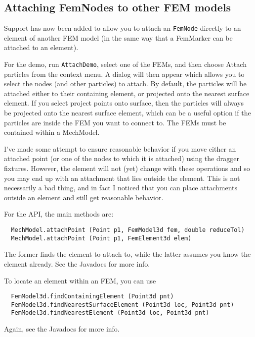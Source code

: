 \documentclass{article}
\begin{document}
\subsection*{Attaching FemNodes to other FEM models}

Support has now been added to allow you to attach an {\tt FemNode}
directly to an element of another FEM model (in the same way that a
FemMarker can be attached to an element).

For the demo, run {\tt AttachDemo}, select one of the FEMs, and then
choose {\sf Attach particles} from the context menu. A dialog will then
appear which allows you to select the nodes (and other particles) to
attach. By default, the particles will be attached either to their
containing element, or projected onto the nearest surface element.  If
you select {\sf project points onto surface}, then the particles will
always be projected onto the nearest surface element, which can be a
useful option if the particles are inside the FEM you want to connect
to. The FEMs must be contained within a MechModel.

I've made some attempt to ensure reasonable behavior if you move
either an attached point (or one of the nodes to which it is attached)
using the dragger fixtures. However, the element will not (yet) change
with these operations and so you may end up with an attachment that
lies outside the element. This is not necessarily a bad thing, and in
fact I noticed that you can place attachments outside an element and
still get reasonable behavior.

For the API, the main methods are:

\begin{lstlisting}
  MechModel.attachPoint (Point p1, FemModel3d fem, double reduceTol)
  MechModel.attachPoint (Point p1, FemElement3d elem)
\end{lstlisting}

The former finds the element to attach to, while the latter assumes you
know the element already. See the Javadocs for more info.

To locate an element within an FEM, you can use

\begin{lstlisting}
  FemModel3d.findContainingElement (Point3d pnt)
  FemModel3d.findNearestSurfaceElement (Point3d loc, Point3d pnt)
  FemModel3d.findNearestElement (Point3d loc, Point3d pnt)
\end{lstlisting}

Again, see the Javadocs for more info.
\end{document}
